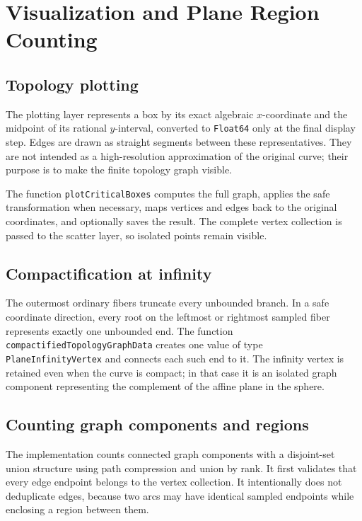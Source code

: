 \documentclass[11pt,a4paper]{article}
\begin{document}
\section{Visualization and Plane Region Counting}

\subsection{Topology plotting}

The plotting layer represents a box by its exact algebraic $x$-coordinate and
the midpoint of its rational $y$-interval, converted to \texttt{Float64} only
at the final display step. Edges are drawn as straight segments between these
representatives. They are not intended as a high-resolution approximation of
the original curve; their purpose is to make the finite topology graph visible.

The function \texttt{plotCriticalBoxes} computes the full graph, applies the
safe transformation when necessary, maps vertices and edges back to the
original coordinates, and optionally saves the result. The complete vertex
collection is passed to the scatter layer, so isolated points remain visible.

\subsection{Compactification at infinity}

The outermost ordinary fibers truncate every unbounded branch. In a safe
coordinate direction, every root on the leftmost or rightmost sampled fiber
represents exactly one unbounded end. The function
\texttt{compactifiedTopologyGraphData} creates one value of type
\texttt{PlaneInfinityVertex} and connects each such end to it. The infinity
vertex is retained even when the curve is compact; in that case it is an
isolated graph component representing the complement of the affine plane in
the sphere.

\subsection{Counting graph components and regions}

The implementation counts connected graph components with a disjoint-set
union structure using path compression and union by rank. It first validates
that every edge endpoint belongs to the vertex collection. It intentionally
does not deduplicate edges, because two arcs may have identical sampled
endpoints while enclosing a region between them.
\end{document}
